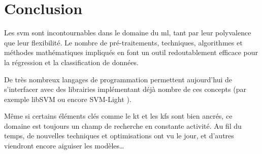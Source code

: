 \section{Conclusion}

Les \gls{svm} sont incontournables dans le domaine du \gls{ml},
tant par leur polyvalence que leur flexibilité.
Le nombre de pré-traitements, techniques, algorithmes et méthodes
mathématiques impliqués en font un outil redoutablement efficace
pour la régression et la classification de données.

De très nombreux langages de programmation permettent aujourd’hui de
s’interfacer avec des librairies implémentant déjà nombre de ces concepts
(par exemple libSVM \cite{lib-svm} ou encore SVM-Light \cite{lib-svm-light}).

Même si certains éléments clés comme le \gls{kt} et les \glspl{kf}
sont bien ancrés, ce domaine est toujours un champ de recherche en
constante activité. Au fil du temps, de nouvelles techniques et optimisations
ont vu le jour, et d’autres viendront encore aiguiser les modèles…

\pagebreak
